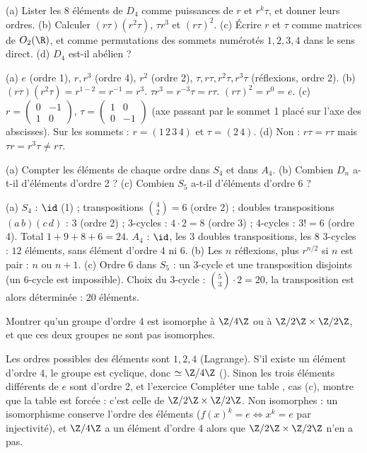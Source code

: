 \begin{exo}[S][Le groupe $D_4$]
(a) Lister les 8 éléments de $D_4$ comme puissances de $r$ et $r^k\tau$, et donner leurs ordres. (b) Calculer $(r\tau)(r^2\tau)$, $\tau r^3$ et $(r\tau)^2$. (c) Écrire $r$ et $\tau$ comme matrices de $O_2(\R)$, et comme permutations des sommets numérotés $1,2,3,4$ dans le sens direct. (d) $D_4$ est-il abélien ?
\begin{corrige}
(a) $e$ (ordre 1), $r,r^3$ (ordre 4), $r^2$ (ordre 2), $\tau,r\tau,r^2\tau,r^3\tau$ (réflexions, ordre 2).
(b) $(r\tau)(r^2\tau)=r^{1-2}=r^{-1}=r^3$. $\tau r^3=r^{-3}\tau=r\tau$. $(r\tau)^2=r^0=e$.
(c) $r=\begin{pmatrix}0&-1\\1&0\end{pmatrix}$, $\tau=\begin{pmatrix}1&0\\0&-1\end{pmatrix}$ (axe passant par le sommet 1 placé sur l'axe des abscisses). Sur les sommets : $r=(1\,2\,3\,4)$ et $\tau=(2\,4)$.
(d) Non : $r\tau=r\tau$ mais $\tau r=r^3\tau\neq r\tau$.
\end{corrige}
\end{exo}
\begin{exo}
(a) Compter les éléments de chaque ordre dans $S_4$ et dans $A_4$. (b) Combien $D_n$ a-t-il d'éléments d'ordre 2 ? (c) Combien $S_5$ a-t-il d'éléments d'ordre 6 ?
\begin{corrige}
(a) $S_4$ : $\id$ (1) ; transpositions $\binom42=6$ (ordre 2) ; doubles transpositions $(a\,b)(c\,d)$ : 3 (ordre 2) ; 3-cycles : $4\cdot2=8$ (ordre 3) ; 4-cycles : $3!=6$ (ordre 4). Total $1+9+8+6=24$. $A_4$ : $\id$, les 3 doubles transpositions, les 8 3-cycles : $12$ éléments, sans élément d'ordre 4 ni 6.
(b) Les $n$ réflexions, plus $r^{n/2}$ si $n$ est pair : $n$ ou $n+1$.
(c) Ordre 6 dans $S_5$ : un 3-cycle et une transposition disjoints (un 6-cycle est impossible). Choix du 3-cycle : $\binom53\cdot2=20$, la transposition est alors déterminée : $20$ éléments.
\end{corrige}
\end{exo}
\begin{exo}
Montrer qu'un groupe d'ordre 4 est isomorphe à $\Z/4\Z$ ou à $\Z/2\Z\times\Z/2\Z$, et que ces deux groupes ne sont pas isomorphes.
\begin{corrige}
Les ordres possibles des éléments sont $1,2,4$ (Lagrange). S'il existe un élément d'ordre 4, le groupe est cyclique, donc $\simeq\Z/4\Z$ (). Sinon les trois éléments différents de $e$ sont d'ordre 2, et l'exercice \og Compléter une table \fg, cas (c), montre que la table est forcée : c'est celle de $\Z/2\Z\times\Z/2\Z$. Non isomorphes : un isomorphisme conserve l'ordre des éléments ($f(x)^k=e\iff x^k=e$ par injectivité), et $\Z/4\Z$ a un élément d'ordre 4 alors que $\Z/2\Z\times\Z/2\Z$ n'en a pas.
\end{corrige}
\end{exo}

